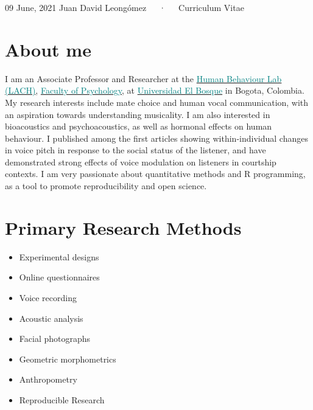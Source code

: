 \documentclass[11pt, a4paper]{awesome-cv}
\begin{document}
\makecvheader

\makecvfooter
  {09 June, 2021}
    {Juan David Leongómez~~~·~~~Curriculum Vitae}
  {\thepage}





\hypertarget{about-me}{%
\section{About me}\label{about-me}}

I am an Associate Professor and Researcher at the
\href{https://sites.google.com/unbosque.edu.co/lach-es}{\textcolor{teal}{Human Behaviour Lab (LACH)}},
\href{https://www.uelbosque.edu.co/psicologia}{\textcolor{teal}{Faculty of Psychology}},
at
\href{https://www.uelbosque.edu.co/}{\textcolor{teal}{Universidad El Bosque}}
in Bogota, Colombia. My research interests include mate choice and human
vocal communication, with an aspiration towards understanding
musicality. I am also interested in bioacoustics and psychoacoustics, as
well as hormonal effects on human behaviour. I published among the first
articles showing within-individual changes in voice pitch in response to
the social status of the listener, and have demonstrated strong effects
of voice modulation on listeners in courtship contexts. I am very
passionate about quantitative methods and R programming, as a tool to
promote reproducibility and open science.

\hypertarget{primary-research-methods}{%
\section{Primary Research Methods}\label{primary-research-methods}}

\begin{multicols}{2}
\begin{itemize}
 \item Experimental designs
 \item Online questionnaires 
 \item Voice recording
 \item Acoustic analysis
 \item Facial photographs
 \item Geometric morphometrics
 \item Anthropometry
 \item Reproducible Research
\end{itemize}
\end{multicols}
\end{document}
